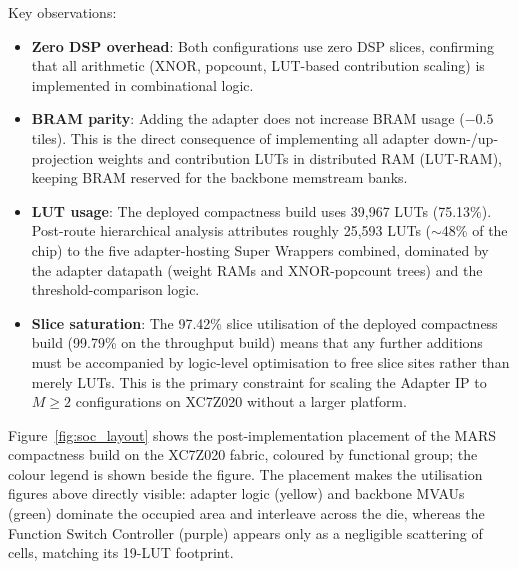 \documentclass[12pt, a4paper]{report}
\numberwithin{equation}{chapter}
\numberwithin{figure}{chapter}
\numberwithin{table}{chapter}
\numberwithin{algorithm}{chapter}
\begin{document}
Key observations:
\begin{itemize}
    \item \textbf{Zero DSP overhead}: Both configurations use zero DSP slices, confirming that all arithmetic (XNOR, popcount, LUT-based contribution scaling) is implemented in combinational logic.
    \item \textbf{BRAM parity}: Adding the adapter does not increase BRAM usage ($-0.5$ tiles). This is the direct consequence of implementing all adapter down-/up-projection weights and contribution LUTs in distributed RAM (LUT-RAM), keeping BRAM reserved for the backbone memstream banks.
    \item \textbf{LUT usage}: The deployed compactness build uses 39{,}967 LUTs (75.13\%). Post-route hierarchical analysis attributes roughly 25{,}593 LUTs ($\sim$48\% of the chip) to the five adapter-hosting Super Wrappers combined, dominated by the adapter datapath (weight RAMs and XNOR-popcount trees) and the threshold-comparison logic.
    \item \textbf{Slice saturation}: The 97.42\% slice utilisation of the deployed compactness build (99.79\% on the throughput build) means that any further additions must be accompanied by logic-level optimisation to free slice sites rather than merely LUTs. This is the primary constraint for scaling the Adapter IP to $M{\geq}2$ configurations on XC7Z020 without a larger platform.
\end{itemize}

Figure~\ref{fig:soc_layout} shows the post-implementation placement of the MARS compactness build on the XC7Z020 fabric, coloured by functional group; the colour legend is shown beside the figure. The placement makes the utilisation figures above directly visible: adapter logic (yellow) and backbone MVAUs (green) dominate the occupied area and interleave across the die, whereas the Function Switch Controller (purple) appears only as a negligible scattering of cells, matching its 19-LUT footprint.
\end{document}
